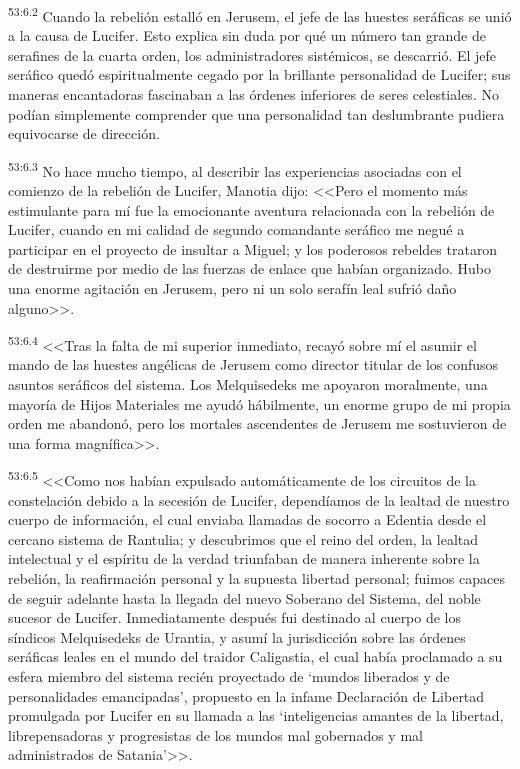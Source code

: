 \par
\textsuperscript{53:6.2} Cuando la rebelión estalló en Jerusem, el jefe de las huestes seráficas se unió a la causa de Lucifer. Esto explica sin duda por qué un número tan grande de serafines de la cuarta orden, los administradores sistémicos, se descarrió. El jefe seráfico quedó espiritualmente cegado por la brillante personalidad de Lucifer; sus maneras encantadoras fascinaban a las órdenes inferiores de seres celestiales. No podían simplemente comprender que una personalidad tan deslumbrante pudiera equivocarse de dirección.

\par
\textsuperscript{53:6.3} No hace mucho tiempo, al describir las experiencias asociadas con el comienzo de la rebelión de Lucifer, Manotia dijo: <<Pero el momento más estimulante para mí fue la emocionante aventura relacionada con la rebelión de Lucifer, cuando en mi calidad de segundo comandante seráfico me negué a participar en el proyecto de insultar a Miguel; y los poderosos rebeldes trataron de destruirme por medio de las fuerzas de enlace que habían organizado. Hubo una enorme agitación en Jerusem, pero ni un solo serafín leal sufrió daño alguno>>.

\par
\textsuperscript{53:6.4} <<Tras la falta de mi superior inmediato, recayó sobre mí el asumir el mando de las huestes angélicas de Jerusem como director titular de los confusos asuntos seráficos del sistema. Los Melquisedeks me apoyaron moralmente, una mayoría de Hijos Materiales me ayudó hábilmente, un enorme grupo de mi propia orden me abandonó, pero los mortales ascendentes de Jerusem me sostuvieron de una forma magnífica>>.

\par
\textsuperscript{53:6.5} <<Como nos habían expulsado automáticamente de los circuitos de la constelación debido a la secesión de Lucifer, dependíamos de la lealtad de nuestro cuerpo de información, el cual enviaba llamadas de socorro a Edentia desde el cercano sistema de Rantulia; y descubrimos que el reino del orden, la lealtad intelectual y el espíritu de la verdad triunfaban de manera inherente sobre la rebelión, la reafirmación personal y la supuesta libertad personal; fuimos capaces de seguir adelante hasta la llegada del nuevo Soberano del Sistema, del noble sucesor de Lucifer. Inmediatamente después fui destinado al cuerpo de los síndicos Melquisedeks de Urantia, y asumí la jurisdicción sobre las órdenes seráficas leales en el mundo del traidor Caligastia, el cual había proclamado a su esfera miembro del sistema recién proyectado de `mundos liberados y de personalidades emancipadas', propuesto en la infame Declaración de Libertad promulgada por Lucifer en su llamada a las `inteligencias amantes de la libertad, librepensadoras y progresistas de los mundos mal gobernados y mal administrados de Satania'>>.

